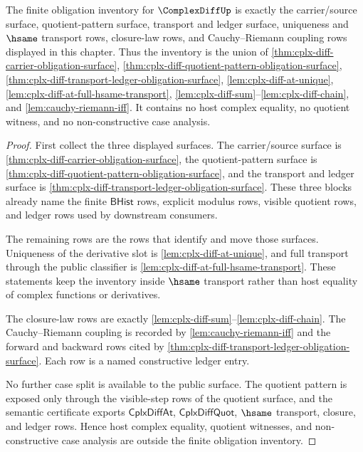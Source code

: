 \begin{theorem}
\label{thm:complexdiff-finite-obligation-inventory-complete}
The finite obligation inventory for $\ComplexDiffUp$ is exactly the
carrier/source surface, quotient-pattern surface, transport and ledger
surface, uniqueness and $\hsame$ transport rows, closure-law rows, and
Cauchy--Riemann coupling rows displayed in this chapter. Thus the inventory is
the union of \autoref{thm:cplx-diff-carrier-obligation-surface},
\autoref{thm:cplx-diff-quotient-pattern-obligation-surface},
\autoref{thm:cplx-diff-transport-ledger-obligation-surface},
\autoref{lem:cplx-diff-at-unique},
\autoref{lem:cplx-diff-at-full-hsame-transport},
\autoref{lem:cplx-diff-sum}--\autoref{lem:cplx-diff-chain}, and
\autoref{lem:cauchy-riemann-iff}. It contains no host complex equality, no
quotient witness, and no non-constructive case analysis.
\end{theorem}
\begin{proof}
First collect the three displayed surfaces. The carrier/source surface is
\autoref{thm:cplx-diff-carrier-obligation-surface}, the quotient-pattern
surface is \autoref{thm:cplx-diff-quotient-pattern-obligation-surface}, and
the transport and ledger surface is
\autoref{thm:cplx-diff-transport-ledger-obligation-surface}. These three
blocks already name the finite $\mathsf{BHist}$ rows, explicit modulus rows,
visible quotient rows, and ledger rows used by downstream consumers.

The remaining rows are the rows that identify and move those surfaces.
Uniqueness of the derivative slot is \autoref{lem:cplx-diff-at-unique}, and
full transport through the public classifier is
\autoref{lem:cplx-diff-at-full-hsame-transport}. These statements keep the
inventory inside $\hsame$ transport rather than host equality of complex
functions or derivatives.

The closure-law rows are exactly
\autoref{lem:cplx-diff-sum}--\autoref{lem:cplx-diff-chain}. The
Cauchy--Riemann coupling is recorded by \autoref{lem:cauchy-riemann-iff} and
the forward and backward rows cited by
\autoref{thm:cplx-diff-transport-ledger-obligation-surface}. Each row is a
named constructive ledger entry.

No further case split is available to the public surface. The quotient pattern
is exposed only through the visible-step rows of the quotient surface, and the
semantic certificate exports $\mathsf{CplxDiffAt}$, $\mathsf{CplxDiffQuot}$,
$\hsame$ transport, closure, and ledger rows. Hence host complex equality,
quotient witnesses, and non-constructive case analysis are outside the finite
obligation inventory.
\end{proof}

